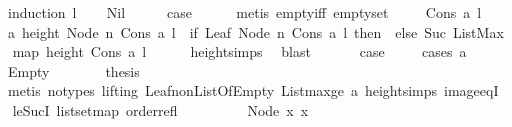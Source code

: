 \begin{isabellebody}
%
\isadelimproof
%
\endisadelimproof
%
\isatagproof
{}\isamarkupfalse%
\ {\isacharparenleft}induction\ l{\isacharparenright}\isanewline
\ \ \isamarkupfalse%
\ Nil\isanewline
\ \ \isamarkupfalse%
\ \isamarkupfalse%
\ {\isacharquery}case\isanewline
\ \ \ \ \isamarkupfalse%
\ {\isacharparenleft}metis\ empty{\isacharunderscore}iff\ empty{\isacharunderscore}set{\isacharparenright}\ \isanewline
{}\isamarkupfalse%
\isanewline
\ \ \isamarkupfalse%
\ {\isacharparenleft}Cons\ a\ l{\isacharparenright}\isanewline
\ \ \isamarkupfalse%
\ a{}{\isacharcolon}\ {\isachardoublequoteopen}height\ {\isacharparenleft}Node\ n\ {\isacharparenleft}Cons\ a\ l{\isacharparenright}{\isacharparenright}\ {\isacharequal}\ {\isacharparenleft}if\ Leaf\ {\isacharparenleft}Node\ n\ {\isacharparenleft}Cons\ a\ l{\isacharparenright}{\isacharparenright}\ then\ {}\ else\ Suc\ {\isacharparenleft}ListMax\ \isanewline
{\isacharparenleft}map\ height\ {\isacharparenleft}Cons\ a\ l{\isacharparenright}{\isacharparenright}{\isacharparenright}{\isacharparenright}{\isachardoublequoteclose}\isanewline
\ \ \ \ \isamarkupfalse%
\ height{\isachardot}simps{\isacharparenleft}{}{\isacharparenright}\ \isamarkupfalse%
\ blast\ \isanewline
\ \ \isamarkupfalse%
\ \isamarkupfalse%
\ {\isacharquery}case\ \isanewline
\ \ \isamarkupfalse%
\ {\isacharparenleft}cases\ {\isachardoublequoteopen}a{\isachardoublequoteclose}{\isacharparenright}\isanewline
\ \ \ \ \isamarkupfalse%
\ Empty\isanewline
\ \ \ \ \isamarkupfalse%
\ \isamarkupfalse%
\ {\isacharquery}thesis\isanewline
\ \ \ \ \ \ \isamarkupfalse%
\ {\isacharparenleft}metis\ {\isacharparenleft}no{\isacharunderscore}types{\isacharcomma}\ lifting{\isacharparenright}\ Leaf{\isacharunderscore}non{\isacharunderscore}ListOfEmpty\ Listmax{\isacharunderscore}ge\ a{}\ height{\isachardot}simps{\isacharparenleft}{}{\isacharparenright}\ image{\isacharunderscore}eqI\ \isanewline
le{\isacharunderscore}SucI\ list{\isachardot}set{\isacharunderscore}map\ order{\isacharunderscore}refl{\isacharparenright}\ \isanewline
\ \ \isamarkupfalse%
\isanewline
\ \ \ \ \isamarkupfalse%
\ {\isacharparenleft}Node\ x{}{}\ x{}{}{\isacharparenright}\isanewline
\ \ \ \ \isamarkupfalse%

\end{isabellebody}
